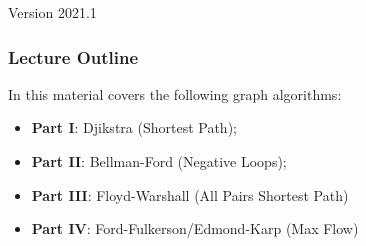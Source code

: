 \documentclass[aspectratio=169]{beamer}
\subtitle[Week 6: Graph II]{Week 6 - Graph Part II: Minimum Path}
\date[]{{\smaller(last updated: \today)}}
\begin{document}
\begin{CJK}{UTF8}{ipxm}

\begin{frame}
\maketitle
\vfill

\hfill Version 2021.1
\end{frame}

\begin{frame}
  \frametitle{Lecture Outline}

  In this material covers the following graph algorithms:

    \begin{itemize}
    \item {\bf Part I}: Djikstra (Shortest Path);
    \item {\bf Part II}: Bellman-Ford (Negative Loops);
    \item {\bf Part III}: Floyd-Warshall (All Pairs Shortest Path)
    \item {\bf Part IV}: Ford-Fulkerson/Edmond-Karp (Max Flow)
    \end{itemize}
  \bigskip
\end{frame}







\end{CJK}
\end{document}
